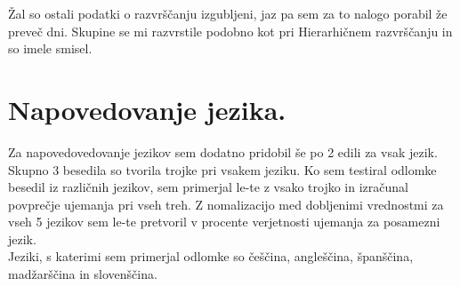 \documentclass[a4paper,11pt]{article}
\begin{document}
Žal so ostali podatki o razvrščanju izgubljeni, jaz pa sem za to nalogo porabil že preveč dni.
Skupine se mi razvrstile podobno kot pri Hierarhičnem razvrščanju in so imele smisel.

\newpage


\section{Napovedovanje jezika.}
Za napovedovedovanje jezikov sem dodatno pridobil še po 2 edili za vsak jezik. Skupno 3 besedila so tvorila trojke pri vsakem jeziku.
Ko sem testiral odlomke besedil iz različnih jezikov, sem primerjal le-te z vsako trojko in izračunal povprečje ujemanja pri vseh treh.
Z nomalizacijo med dobljenimi vrednostmi za vseh 5 jezikov sem le-te pretvoril v procente verjetnosti ujemanja za posamezni jezik.
\\Jeziki, s katerimi sem primerjal odlomke so češčina, angleščina, španščina, madžarščina in slovenščina.
\end{document}
